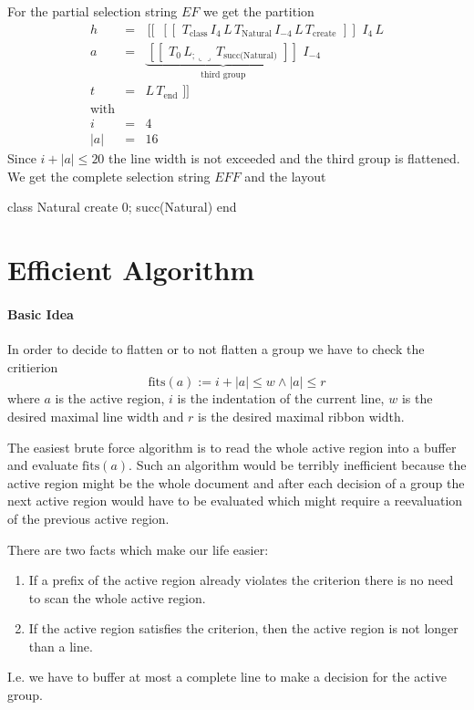 \documentclass[12pt]{article}
\def\blank{\llcorner\!\!\lrcorner}
\def\class{\text{class}}
\def\create{\text{create}}
\def\fits{\text{fits}}
\def\kwend{\text{end}}
\def\GS{\,[\![\,}
\def\GE{\,]\!]\,}
\def\Natural{\text{Natural}}
\begin{document}
For the partial selection string $EF$ we get the partition
$$
\begin{array}{lll}
  h &=& \GS \,
        \GS \, T_\class\,
        I_4\, L\, T_\Natural\, I_{-4}\, L \, T_\create\, \GE \, I_4\, L
  \\
  a &=& \underbrace{
        \GS \,T_0\, L_{;\blank}\, T_\text{succ(Natural)}\, \GE
        }_{\text{third group}}
        \, I_{-4}
  \\
  t & = & L \, T_\kwend \, \GE
  \\
  \text{with}
  \\
  i & = & 4
  \\
  |a| & = & 16%
\end{array}
$$%
Since $i + |a| \le 20$ the line width is not exceeded and the third group is
flattened. We get the complete selection string $E F F$ and the layout
\begin{alba}
    class Natural create
        0; succ(Natural)
    end
\end{alba}



\section{Efficient Algorithm}


\paragraph{Basic Idea}
In order to decide to flatten or to not flatten a group we have to check the
critierion
$$
\fits(a) := i + |a| \le w \land |a| \le r
$$%
where $a$ is the active region, $i$ is the indentation of the current line,
$w$ is the desired maximal line width and $r$ is the desired maximal ribbon
width.

The easiest brute force algorithm is to read the whole active region into a
buffer and evaluate $\fits(a)$. Such an algorithm would be terribly
inefficient because the active region might be the whole document and after
each decision of a group the next active region would have to be evaluated
which might require a reevaluation of the previous active region.

There are two facts which make our life easier:
\begin{enumerate}
\item If a prefix of the active region already violates the criterion there is
  no need to scan the whole active region.

\item If the active region satisfies the criterion, then the active region is
  not longer than a line.
\end{enumerate}
%
I.e. we have to buffer at most a complete line to make a decision for the
active group.
\end{document}
